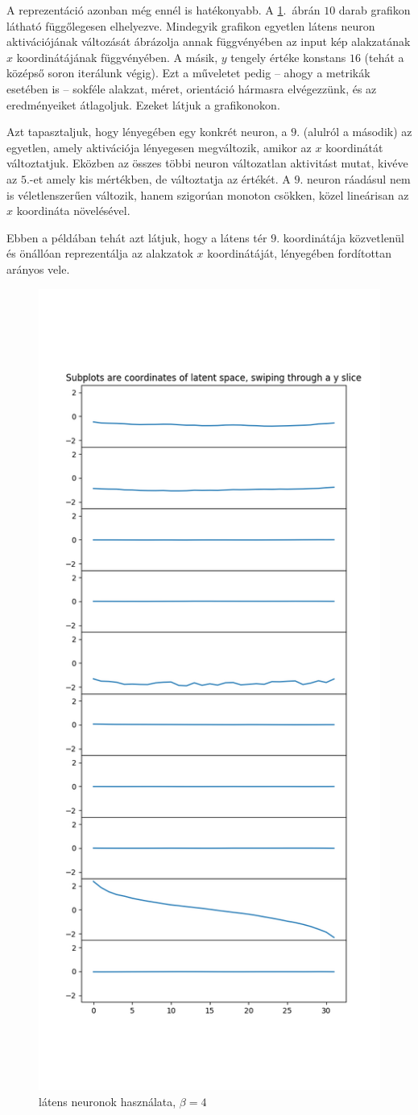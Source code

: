 A reprezentáció azonban még ennél is hatékonyabb. A \ref{b4-splice}.~ábrán $10$ darab grafikon látható függőlegesen elhelyezve. Mindegyik grafikon egyetlen látens neuron aktivációjának változását ábrázolja annak függvényében az input kép alakzatának $x$ koordinátájának függvényében. A másik, $y$ tengely értéke konstans $16$ (tehát a középső soron iterálunk végig). Ezt a műveletet pedig -- ahogy a metrikák esetében is -- sokféle alakzat, méret, orientáció hármasra elvégezzünk, és az eredményeiket átlagoljuk. Ezeket látjuk a grafikonokon. 

Azt tapasztaljuk, hogy lényegében egy konkrét neuron, a $9$. (alulról a második) az egyetlen, amely aktivációja lényegesen megváltozik, amikor az $x$ koordinátát változtatjuk. Eközben az összes többi neuron változatlan aktivitást mutat, kivéve az $5.$-et amely kis mértékben, de változtatja az értékét. A $9$. neuron ráadásul nem is véletlenszerűen változik, hanem szigorúan monoton csökken, közel lineárisan az $x$ koordináta növelésével.

Ebben a példában tehát azt látjuk, hogy a látens tér $9$. koordinátája közvetlenül és önállóan reprezentálja  az alakzatok $x$ koordinátáját, lényegében fordítottan arányos vele.

\begin{figure}[h!]
\begin{center}
  
  \includegraphics[width=0.5\linewidth]{slice_y16_all_coordsb4.png}
  \caption{látens neuronok használata, $\beta=4$}\label{b4-splice}
\end{center}
\end{figure}

